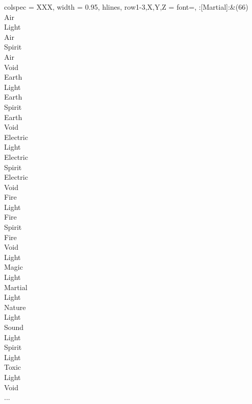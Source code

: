 \begin{longtblr}[
	caption = {2v1 Defending Resisted},
	label = {2v1-Defending-Resisted},
]{
	colspec = {XXX}, width = 0.95\linewidth,
	hlines,
	row{1-3,X,Y,Z} = {font=\bfseries},
}
	:[Martial]:&{(66)\\
	Air \\
	Light \\
	Air \\
	Spirit \\
	Air \\
	Void \\
	Earth \\
	Light \\
	Earth \\
	Spirit \\
	Earth \\
	Void \\
	Electric \\
	Light \\
	Electric \\
	Spirit \\
	Electric \\
	Void \\
	Fire \\
	Light \\
	Fire \\
	Spirit \\
	Fire \\
	Void \\
	Light \\
	Magic \\
	Light \\
	Martial \\
	Light \\
	Nature \\
	Light \\
	Sound \\
	Light \\
	Spirit \\
	Light \\
	Toxic \\
	Light \\
	Void \\
	...\\
	}\\


\end{longtblr}
